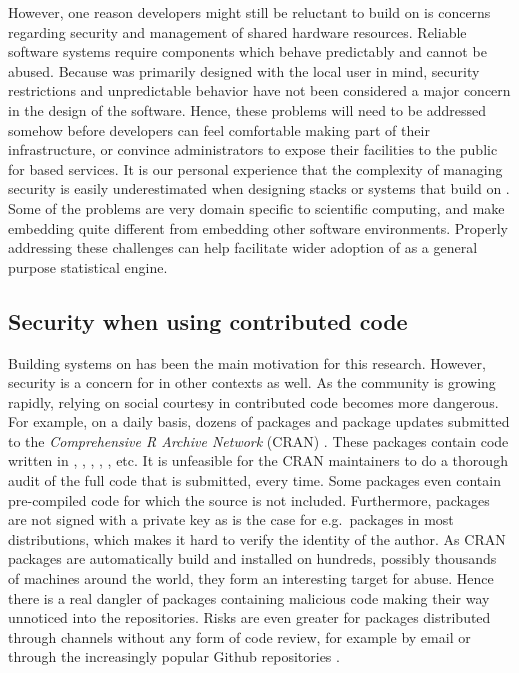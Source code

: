 However, one reason developers might still be reluctant to build on \R is
concerns regarding security and management of shared hardware resources.
Reliable software systems require components which behave predictably and
cannot be abused. Because \R was primarily designed with the local user in
mind, security restrictions and unpredictable behavior have not been considered
a major concern in the design of the software. Hence, these problems will need
to be addressed somehow before developers can feel comfortable making \R part
of their infrastructure, or convince administrators to expose their facilities
to the public for \R based services. It is our personal experience that the
complexity of managing security is easily underestimated when designing stacks
or systems that build on \R. Some of the problems are very domain specific to
scientific computing, and make embedding \R quite different from embedding
other software environments. Properly addressing these challenges can help
facilitate wider adoption of \R as a general purpose statistical engine.

\subsection{Security when using contributed code}

Building systems on \R has been the main motivation for this research. However,
security is a concern for \R in other contexts as well. As the community is
growing rapidly, relying on social courtesy in contributed code becomes more
dangerous. For example, on a daily basis, dozens of packages and package updates
submitted to the \emph{Comprehensive R Archive Network} (CRAN)
\citep{ripleycran}. These packages contain code written in \R, \C, \Fortran,
\Cpp, \Java, etc. It is unfeasible for the CRAN maintainers to do a thorough
audit of the full code that is submitted, every time. Some packages even contain
pre-compiled \Java code for which the source is not included. Furthermore, \R
packages are not signed with a private key as is the case for e.g.\ packages in
most \Linux distributions, which makes it hard to verify the identity of the
author. As CRAN packages are automatically build and installed on hundreds,
possibly thousands of machines around the world, they form an interesting
target for abuse. Hence there is a real dangler of packages containing
malicious code making their way unnoticed into the repositories. Risks are even
greater for packages distributed through channels without any form of code
review, for example by email or through the increasingly popular Github
repositories \citep{torvalds2010git,dabbish2012social}.

